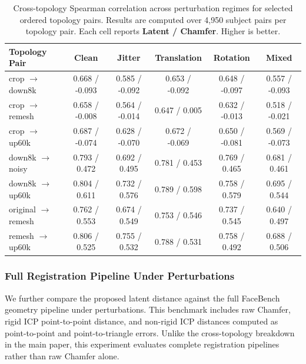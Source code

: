 \begin{table}[h]
\centering
\small
\caption{
Cross-topology Spearman correlation across perturbation regimes for selected
ordered topology pairs. Results are computed over 4,950 subject pairs per
topology pair. Each cell reports \textbf{Latent / Chamfer}. Higher is better.
}
\label{tab:xtopo_latent_chamfer_app}
\begin{tabular}{lccccc}
\toprule
Topology Pair & Clean & Jitter & Translation & Rotation & Mixed \\
\midrule
crop $\rightarrow$ down8k
& 0.668 / -0.093
& 0.585 / -0.092
& 0.653 / -0.092
& 0.648 / -0.097
& 0.557 / -0.093 \\

crop $\rightarrow$ remesh
& 0.658 / -0.008
& 0.564 / -0.014
& 0.647 / 0.005
& 0.632 / -0.013
& 0.518 / -0.021 \\

crop $\rightarrow$ up60k
& 0.687 / -0.074
& 0.628 / -0.070
& 0.672 / -0.069
& 0.650 / -0.081
& 0.569 / -0.073 \\

down8k $\rightarrow$ noisy
& 0.793 / 0.472
& 0.692 / 0.495
& 0.781 / 0.453
& 0.769 / 0.465
& 0.681 / 0.461 \\

down8k $\rightarrow$ up60k
& 0.804 / 0.611
& 0.732 / 0.576
& 0.789 / 0.598
& 0.758 / 0.579
& 0.695 / 0.544 \\

original $\rightarrow$ remesh
& 0.762 / 0.553
& 0.674 / 0.549
& 0.753 / 0.546
& 0.737 / 0.545
& 0.640 / 0.497 \\

remesh $\rightarrow$ up60k
& 0.806 / 0.525
& 0.755 / 0.532
& 0.788 / 0.531
& 0.758 / 0.492
& 0.688 / 0.506 \\
\bottomrule
\end{tabular}
\end{table}

\subsubsection{Full Registration Pipeline Under Perturbations}
\label{app:facebench_pipeline_perturbations}

We further compare the proposed latent distance against the full FaceBench
geometry pipeline under perturbations. This benchmark includes raw Chamfer,
rigid ICP point-to-point distance, and non-rigid ICP distances computed as
point-to-point and point-to-triangle errors. Unlike the cross-topology breakdown
in the main paper, this experiment evaluates complete registration pipelines
rather than raw Chamfer alone.

